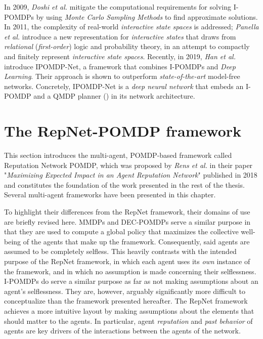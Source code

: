 In 2009, \textit{Doshi et al.} \cite{monteipomdp} mitigate the computational requirements for solving I-POMDPs by using \textit{Monte Carlo Sampling Methods} to find approximate solutions. In 2011, the complexity of real-world \textit{interactive state spaces} is addressed; \textit{Panella et al.} \cite{impomdprel} introduce a new representation for \textit{interactive states} that draws from \textit{relational} (\textit{first-order}) logic and probability theory, in an attempt to compactly and finitely represent \textit{interactive state spaces}. Recently, in 2019, \textit{Han et al.} \cite{impomdpnn} introduce IPOMDP-Net, a framework that combines I-POMDPs and \textit{Deep Learning}. Their approach is shown to outperform \textit{state-of-the-art} model-free networks. Concretely, IPOMDP-Net is a \textit{deep neural network} that embeds an I-POMDP and a QMDP planner (\cite{qmdp}) in its network architecture.
\section{The RepNet-POMDP framework}
\label{sec:repnet}
This section introduces the multi-agent, POMDP-based framework called Reputation Network POMDP, which was proposed by \textit{Rens et al.} in their paper "\textit{Maximizing Expected Impact in an Agent
Reputation Network}" published in 2018 \cite{rensetal} and constitutes the foundation of the work presented in the rest of the thesis. Several multi-agent frameworks have been presented in this chapter. 

To highlight their differences from the RepNet framework, their domains of use are briefly revised here. MMDPs and DEC-POMDPs serve a similar purpose in that they are used to compute a global policy that maximizes the collective well-being of the agents that make up the framework. Consequently, said agents are assumed to be completely selfless. This heavily contrasts with the intended purpose of the RepNet framework, in which each agent uses its \textit{own} instance of the framework, and in which no assumption is made concerning their selflessness. I-POMDPs do serve a similar purpose as far as not making assumptions about an agent's selflessness. They are, however, arguably significantly more difficult to conceptualize than the framework presented hereafter. The RepNet framework achieves a more intuitive layout by making assumptions about the elements that should matter to the agents. In particular, agent \textit{reputation} and \textit{past behavior} of agents are key drivers of the interactions between the agents of the network.



